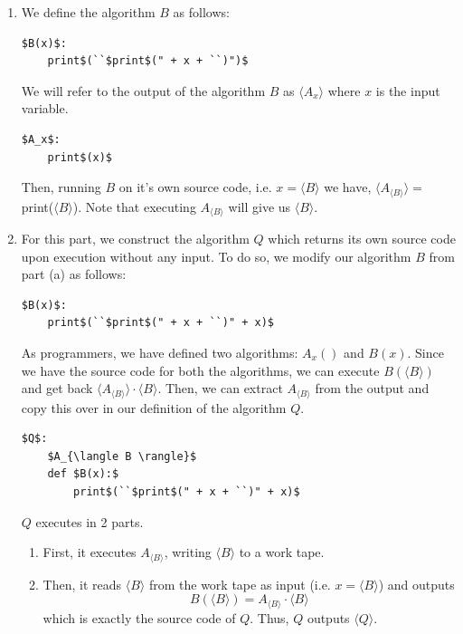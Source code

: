 \documentclass[12pt]{article}
\begin{document}
\begin{solution}

\bbni

\begin{enumerate}
    \item [(a)] We define the algorithm $B$ as follows: 
    \begin{lstlisting}[mathescape]
$B(x)$: 
    print$(``$print$(" + x + ``)")$
    \end{lstlisting}
    We will refer to the output of the algorithm $B$ as $\langle A_x \rangle$ where $x$ is the input variable. 
    \begin{lstlisting}[mathescape]
$A_x$: 
    print$(x)$
    \end{lstlisting}
    Then, running $B$ on it's own source code, i.e. $x = \langle B \rangle$ we have, $\langle A_{\langle B \rangle} \rangle = $ print($\langle B \rangle$). Note that executing $A_{\langle B \rangle}$ will give us $\langle B \rangle$.

    
    \item [(b)] For this part, we construct the algorithm $Q$ which returns its own source code upon execution without any input. To do so, we modify our algorithm $B$ from part (a) as follows: 
    \begin{lstlisting}[mathescape]
$B(x)$: 
    print$(``$print$(" + x + ``)" + x)$
    \end{lstlisting}

    As programmers, we have defined two algorithms: $A_x()$ and $B(x)$. Since we have the source code for both the algorithms, we can execute $B(\langle B\rangle )$ and get back $\langle A_{\langle B \rangle} \rangle \cdot \langle B \rangle$. Then, we can extract $A_{\langle B \rangle}$ from the output and copy this over in our definition of the algorithm $Q$.
    \begin{lstlisting}[mathescape]
$Q$: 
    $A_{\langle B \rangle}$
    def $B(x):$
        print$(``$print$(" + x + ``)" + x)$
    \end{lstlisting}
    $Q$ executes in 2 parts. 
    \begin{enumerate}
        \item First, it executes $A_{\langle B \rangle}$, writing ${\langle B \rangle}$ to a work tape. 
        \item Then, it reads $\langle B \rangle$ from the work tape as input (i.e. $x = {\langle B \rangle}$)  and outputs
        \[B(\langle B \rangle) = A_{\langle B \rangle} \cdot {\langle B \rangle}\]
        which is exactly the source code of $Q$. Thus, $Q$ outputs $\langle Q \rangle$. 
    \end{enumerate}
    
\end{enumerate}
    
\end{solution}
\end{document}
